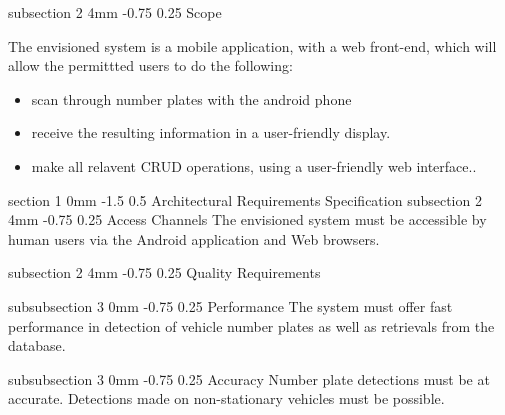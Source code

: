 \documentclass[12pt]{article}
\makeatletter
\renewcommand{\section}{\@startsection
   {section}%
   {1}%
   {0mm}%
   {-1.5\baselineskip}%
   {0.5\baselineskip}%
   {\sffamily\bfseries\upshape\normalsize}}%
\renewcommand{\subsection}{\@startsection
   {subsection}%
   {2}%
   {4mm}%
   {-0.75\baselineskip}%
   {0.25\baselineskip}%
   {\rmfamily\normalfont\scshape\normalsize}}%
\renewcommand{\subsubsection}{\@startsection
   {subsubsection}%
   {3}%
   {0mm}%
   {-0.75\baselineskip}%
   {0.25\baselineskip}%
   {\rmfamily\normalfont\slshape\normalsize}}%
\makeatother
\begin{document}
                		\subsection{Scope}
                			
                				The envisioned system is a mobile application, with a web front-end, which will allow the permittted users to do the following:
                			    		\begin{itemize}
                								\item scan through number plates with the android phone
                				                \item receive the resulting information in a user-friendly display.
                				                \item make all relavent CRUD operations, using a user-friendly web interface..
                				                
                			            \end{itemize}
                		
                \section{Architectural Requirements Specification}
                		\subsection{Access Channels }
                				The envisioned system must be accessible by human users via the Android application and Web browsers.
                			
                		\subsection{Quality Requirements}
                		
                				\subsubsection{Performance}
		   			                  	The system must offer fast performance in detection of vehicle number plates as well as retrievals from the database.
		   			                  	
                			    \subsubsection{Accuracy}
                			    		Number plate detections must be at accurate. Detections made on non-stationary vehicles must be possible.
                			    		             	
\end{document}

